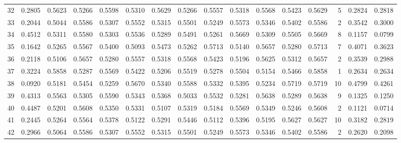 \begin{tabular}{lrrrrrrrrrrrrrrr}
32  &      0.2805 &  0.5623 &  0.5266 &  0.5598 &  0.5310 &  0.5629 &  0.5266 &  0.5557 &  0.5318 &  0.5568 &   0.5423 &     0.5629 &      5 &                    0.2824 &                     0.2818 \\
33  &      0.2044 &  0.5044 &  0.5586 &  0.5307 &  0.5552 &  0.5315 &  0.5501 &  0.5249 &  0.5573 &  0.5346 &   0.5402 &     0.5586 &      2 &                    0.3542 &                     0.3000 \\
34  &      0.4512 &  0.5311 &  0.5580 &  0.5303 &  0.5536 &  0.5289 &  0.5491 &  0.5261 &  0.5669 &  0.5309 &   0.5505 &     0.5669 &      8 &                    0.1157 &                     0.0799 \\
35  &      0.1642 &  0.5265 &  0.5567 &  0.5400 &  0.5093 &  0.5473 &  0.5262 &  0.5713 &  0.5140 &  0.5657 &   0.5280 &     0.5713 &      7 &                    0.4071 &                     0.3623 \\
36  &      0.2118 &  0.5106 &  0.5657 &  0.5280 &  0.5557 &  0.5318 &  0.5568 &  0.5423 &  0.5196 &  0.5625 &   0.5312 &     0.5657 &      2 &                    0.3539 &                     0.2988 \\
37  &      0.3224 &  0.5858 &  0.5287 &  0.5569 &  0.5422 &  0.5206 &  0.5519 &  0.5278 &  0.5504 &  0.5154 &   0.5466 &     0.5858 &      1 &                    0.2634 &                     0.2634 \\
38  &      0.0920 &  0.5181 &  0.5454 &  0.5259 &  0.5670 &  0.5340 &  0.5588 &  0.5332 &  0.5395 &  0.5234 &   0.5719 &     0.5719 &     10 &                    0.4799 &                     0.4261 \\
39  &      0.4313 &  0.5563 &  0.5305 &  0.5590 &  0.5343 &  0.5368 &  0.5033 &  0.5532 &  0.5281 &  0.5638 &   0.5289 &     0.5638 &      9 &                    0.1325 &                     0.1250 \\
40  &      0.4487 &  0.5201 &  0.5608 &  0.5350 &  0.5331 &  0.5107 &  0.5319 &  0.5184 &  0.5569 &  0.5349 &   0.5246 &     0.5608 &      2 &                    0.1121 &                     0.0714 \\
41  &      0.2445 &  0.5264 &  0.5564 &  0.5378 &  0.5122 &  0.5291 &  0.5446 &  0.5112 &  0.5396 &  0.5195 &   0.5627 &     0.5627 &     10 &                    0.3182 &                     0.2819 \\
42  &      0.2966 &  0.5064 &  0.5586 &  0.5307 &  0.5552 &  0.5315 &  0.5501 &  0.5249 &  0.5573 &  0.5346 &   0.5402 &     0.5586 &      2 &                    0.2620 &                     0.2098 \\

\end{tabular}
